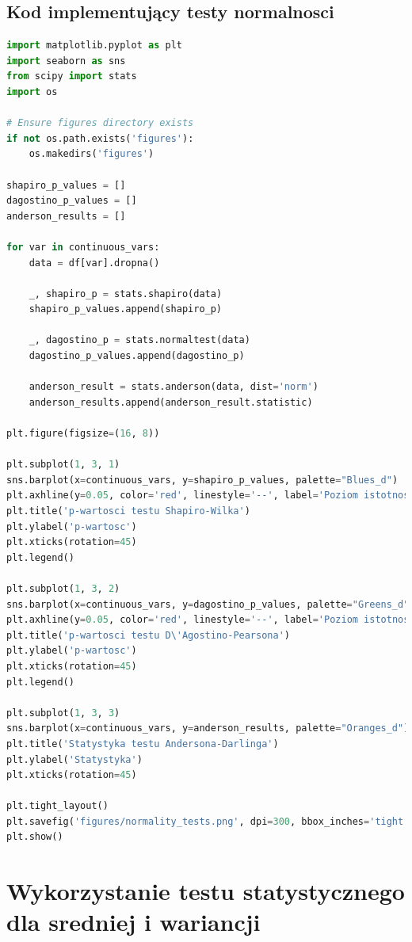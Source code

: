 \documentclass[12pt,a4paper]{article}
\begin{document}
\subsection{Kod implementujący testy normalnosci}
\begin{lstlisting}[language=Python, caption=Kod testów normalnosci]
import matplotlib.pyplot as plt
import seaborn as sns
from scipy import stats
import os

# Ensure figures directory exists
if not os.path.exists('figures'):
    os.makedirs('figures')

shapiro_p_values = []
dagostino_p_values = []
anderson_results = []

for var in continuous_vars:
    data = df[var].dropna()
    
    _, shapiro_p = stats.shapiro(data)
    shapiro_p_values.append(shapiro_p)
    
    _, dagostino_p = stats.normaltest(data)
    dagostino_p_values.append(dagostino_p)
    
    anderson_result = stats.anderson(data, dist='norm')
    anderson_results.append(anderson_result.statistic)

plt.figure(figsize=(16, 8))

plt.subplot(1, 3, 1)
sns.barplot(x=continuous_vars, y=shapiro_p_values, palette="Blues_d")
plt.axhline(y=0.05, color='red', linestyle='--', label='Poziom istotnosci (0.05)')
plt.title('p-wartosci testu Shapiro-Wilka')
plt.ylabel('p-wartosc')
plt.xticks(rotation=45)
plt.legend()

plt.subplot(1, 3, 2)
sns.barplot(x=continuous_vars, y=dagostino_p_values, palette="Greens_d")
plt.axhline(y=0.05, color='red', linestyle='--', label='Poziom istotnosci (0.05)')
plt.title('p-wartosci testu D\'Agostino-Pearsona')
plt.ylabel('p-wartosc')
plt.xticks(rotation=45)
plt.legend()

plt.subplot(1, 3, 3)
sns.barplot(x=continuous_vars, y=anderson_results, palette="Oranges_d")
plt.title('Statystyka testu Andersona-Darlinga')
plt.ylabel('Statystyka')
plt.xticks(rotation=45)

plt.tight_layout()
plt.savefig('figures/normality_tests.png', dpi=300, bbox_inches='tight')
plt.show()
\end{lstlisting}

\section{Wykorzystanie testu statystycznego dla sredniej i wariancji}
\end{document}
